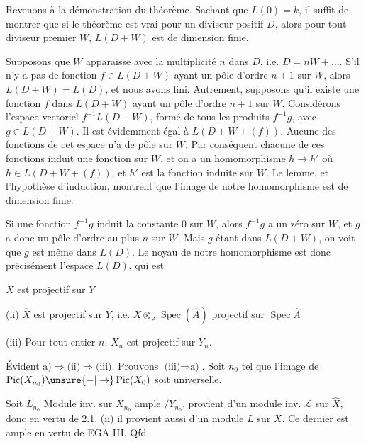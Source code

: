 Revenons à la démonstration du théorème. Sachant que $L(0)=k$, il suffit de montrer que si le théorème est vrai pour un diviseur positif $D$, alors pour tout diviseur premier $W$, $L(D+W)$ est de dimension finie.

Supposons que $W$ apparaisse avec la multiplicité $n$ dans $D$, i.e. $D=nW+\ldots$. S'il n'y a pas de fonction $f\in L(D+W)$ ayant un pôle d'ordre $n+1$ sur $W$, alors $L(D+W)=L(D)$, et nous avons fini. Autrement, supposons qu'il existe une fonction $f$ dans $L(D+W)$ ayant un pôle d'ordre $n+1$ sur $W$. Considérons l'espace vectoriel $f^{-1}L(D+W)$, formé de tous les produits $f^{-1}g$, avec $g\in L(D+W)$. Il est évidemment égal à $L(D+W+(f))$. Aucune des fonctions de cet espace n'a de pôle sur $W$. Par conséquent chacune de ces fonctions induit une fonction sur $W$, et on a un homomorphisme $h\longrightarrow h'$ où $h\in L(D+W+(f))$, et $h'$ est la fonction induite sur $W$. Le lemme, et l'hypothèse d'induction, montrent que l'image de notre homomorphisme est de dimension finie.

Si une fonction $f^{-1}g$ induit la constante $0$ sur $W$, alors $f^{-1}g$ a un zéro sur $W$, et $g$ a donc un pôle d'ordre au plus $n$ sur $W$. Mais $g$ étant dans $L(D+W)$, on voit que $g$ est même dans $L(D)$. Le noyau de notre homomorphisme est donc précisément l'espace $L(D)$, qui est


 $X$ est projectif sur $Y$

(ii) $\widehat X$ est projectif sur $\widehat Y$, i.e. $X\otimes_A\operatorname{Spec}(\widehat A)$ projectif sur $\operatorname{Spec}\widehat A$

(iii) Pour tout entier $n$, $X_n$ est projectif sur $Y_n$.

Évident $\text{a)}\Rightarrow\text{(ii)}\Rightarrow\text{(iii)}$. Prouvons $\text{(iii)}\Rightarrow\text{a)}$. Soit $n_0$ tel que l'image de $\operatorname{Pic}(X_{n_0})\unsure{-|\to}\operatorname{Pic}(X_0)$ soit universelle.

Soit $L_{n_0}$ Module inv. sur $X_{n_0}$ ample $/Y_{n_0}$.   provient d'un module inv. $\mathcal L$ sur $\widehat X$, donc en vertu de  2.1. (ii) il provient aussi d'un module  $L$ sur $X$. Ce dernier est ample en vertu de EGA III. Qfd.



